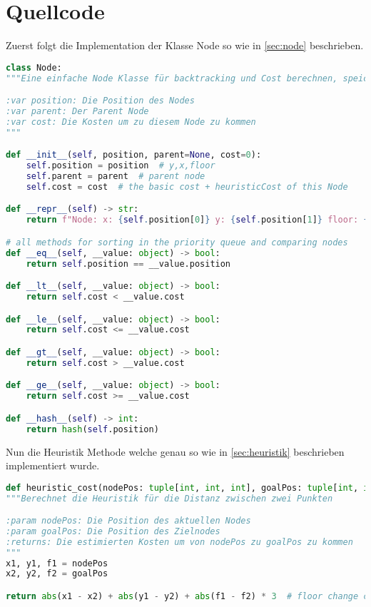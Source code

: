 \documentclass[a4paper,10pt,ngerman]{scrartcl}
\begin{document}
\section{Quellcode}
Zuerst folgt die Implementation der Klasse Node so wie in \cref{sec:node} beschrieben.
\begin{lstlisting}[language=Python]
class Node:
"""Eine einfache Node Klasse für backtracking und Cost berechnen, speichert auch die Position

:var position: Die Position des Nodes
:var parent: Der Parent Node
:var cost: Die Kosten um zu diesem Node zu kommen
"""

def __init__(self, position, parent=None, cost=0):
    self.position = position  # y,x,floor
    self.parent = parent  # parent node
    self.cost = cost  # the basic cost + heuristicCost of this Node

def __repr__(self) -> str:
    return f"Node: x: {self.position[0]} y: {self.position[1]} floor: {self.position[2]} cost: {self.cost}"

# all methods for sorting in the priority queue and comparing nodes
def __eq__(self, __value: object) -> bool:
    return self.position == __value.position

def __lt__(self, __value: object) -> bool:
    return self.cost < __value.cost

def __le__(self, __value: object) -> bool:
    return self.cost <= __value.cost

def __gt__(self, __value: object) -> bool:
    return self.cost > __value.cost

def __ge__(self, __value: object) -> bool:
    return self.cost >= __value.cost

def __hash__(self) -> int:
    return hash(self.position)
\end{lstlisting}
Nun die Heuristik Methode welche genau so wie in \cref{sec:heuristik} beschrieben implementiert wurde.
\begin{lstlisting}[language=Python]
def heuristic_cost(nodePos: tuple[int, int, int], goalPos: tuple[int, int, int]) -> int:
"""Berechnet die Heuristik für die Distanz zwischen zwei Punkten

:param nodePos: Die Position des aktuellen Nodes
:param goalPos: Die Position des Zielnodes
:returns: Die estimierten Kosten um von nodePos zu goalPos zu kommen
"""
x1, y1, f1 = nodePos
x2, y2, f2 = goalPos

return abs(x1 - x2) + abs(y1 - y2) + abs(f1 - f2) * 3  # floor change cost is 3
\end{lstlisting}
\end{document}
